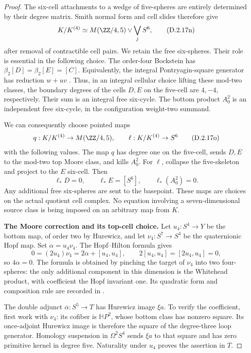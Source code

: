 \begin{proof}
The six-cell attachments to a wedge of five-spheres are entirely
determined by their degree matrix. Smith normal form and cell
slides therefore give
\[
 K/K^{(4)}\simeq M(\ZZ/4,5)\vee\bigvee_j S^6,
 \tag{D.2.17n}
\]
after removal of contractible cell pairs. We retain the free
six-spheres. Their role is essential in the following choice.
The order-four Bockstein has
$\beta_2[D]=\beta_2[E]=[C]$. Equivalently, the integral
Pontryagin-square generator has reduction $w+uv$
\cite[\S2.3, p.~1336]{I_Mahowald1964}.
Thus, in an integral cellular choice lifting these mod-two
classes, the boundary degrees of the cells $D,E$ on the
five-cell are $4,-4$, respectively. Their sum is an integral
free six-cycle. The bottom product $A_0^2$ is an independent
free six-cycle, in the configuration weight-two summand.

We can consequently choose pointed maps
\[
 q:K/K^{(4)}\to M(\ZZ/4,5),\qquad
 \ell:K/K^{(4)}\to S^6
 \tag{D.2.17o}
\]
with the following values. The map $q$ has degree one on the
five-cell, sends $D,E$ to the mod-two top Moore class, and
kills $A_0^2$. For $\ell$, collapse the five-skeleton and project
to the $E$ six-cell. Then
\[
 \ell_*D=0,\qquad \ell_*E=[S^6],\qquad \ell_*(A_0^2)=0.
 \tag{D.2.17p}
\]
Any additional free six-spheres are sent to the basepoint.
These maps are choices on the actual quotient cell complex.
No equation involving a seven-dimensional source class is being
imposed on an arbitrary map from $K$.

\medskip\noindent
\textbf{The Moore correction and its top-cell choice.}
Let $u_4:S^4\to Y$ be the bottom map, of order two by Hurewicz,
and let $\nu_4:S^7\to S^4$ be the quaternionic Hopf map.
Set $\alpha=u_4\nu_4$. The Hopf--Hilton formula gives
\[
 0=(2u_4)\nu_4=2\alpha+[u_4,u_4],
 \qquad 2[u_4,u_4]=[2u_4,u_4]=0,
 \tag{D.2.17q}
\]
so $4\alpha=0$. The formula is obtained by pinching the target
of $\nu_4$ into two four-spheres: the only additional component
in this dimension is the Whitehead product, with coefficient
the Hopf invariant one. Its quadratic form and composition rule
are recorded in \cite[(8.2)(4), (8.4), and Lemma~8.5,
pp.~4756--4757]{I_Baues1996}.

The double adjunct $\overline\alpha:S^5\to T$ has Hurewicz
image $\xi a$. To verify the coefficient, first work with
$\nu_4$: its cofiber is $\mathbb HP^2$, whose bottom class has
nonzero square. Its once-adjoint Hurewicz image is therefore
the square of the degree-three loop generator. Homology
suspension in $\Omega^2S^4$ sends $\xi a$ to that square and
has zero primitive kernel in degree five. Naturality under
$u_4$ proves the assertion in $T$.


\end{proof}
